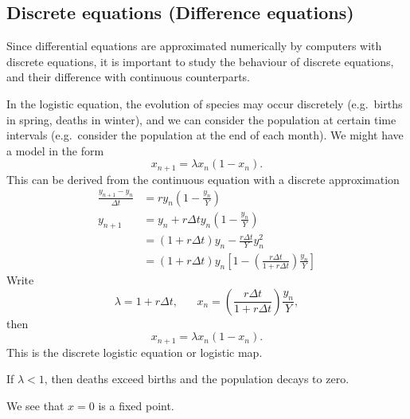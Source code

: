 \documentclass[a4paper]{article}
\begin{document}
\subsection{Discrete equations (Difference equations)}
Since differential equations are approximated numerically by computers with discrete equations, it is important to study the behaviour of discrete equations, and their difference with continuous counterparts.

In the logistic equation, the evolution of species may occur discretely (e.g.\ births in spring, deaths in winter), and we can consider the population at certain time intervals (e.g.\ consider the population at the end of each month). We might have a model in the form
\[
  x_{n + 1} = \lambda x_n(1 - x_n).
\]
This can be derived from the continuous equation with a discrete approximation
\begin{align*}
  \frac{y_{n+1} - y_n}{\Delta t} &= ry_n\left(1 - \frac{y_n}{Y}\right)\\
  y_{n + 1} &= y_n + r\Delta ty_n\left(1 - \frac{y_n}{Y}\right)\\
  &= (1 + r\Delta t)y_n - \frac{r\Delta t}{Y}y_n^2\\
  &= (1 + r\Delta t)y_n\left[1 - \left(\frac{r\Delta t}{1 + r\Delta t}\right)\frac{y_n}{Y}\right]
\end{align*}
Write
\[
  \lambda = 1 + r\Delta t,\;\;\;\;\;\; x_n = \left(\frac{r\Delta t}{1 + r\Delta t}\right)\frac{y_n}{Y},
\]
then
\[
  x_{n+1}=\lambda x_n(1 - x_n).
\]
This is the discrete logistic equation or logistic map.

If $\lambda < 1$, then deaths exceed births and the population decays to zero.
\begin{center}
\end{center}
We see that $x = 0$ is a fixed point.
\end{document}
